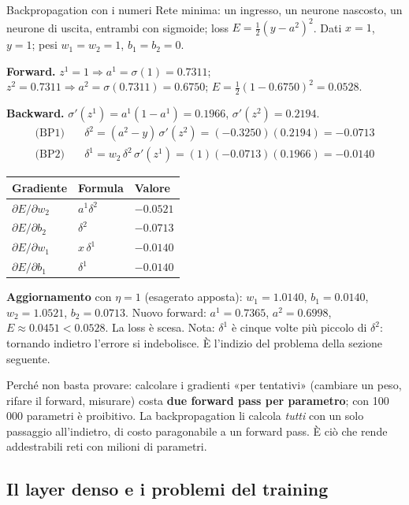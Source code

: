 \documentclass[12pt]{extarticle}
\begin{document}
\begin{esempiobox}{Backpropagation con i numeri}
Rete minima: un ingresso, un neurone nascosto, un neurone di uscita, entrambi con sigmoide; loss $E=\frac12(y-a^2)^2$. Dati $x=1$, $y=1$; pesi $w_1=w_2=1$, $b_1=b_2=0$.

\smallskip\noindent\textbf{Forward.} $z^1=1\Rightarrow a^1=\sigma(1)=0.7311$; $z^2=0.7311\Rightarrow a^2=\sigma(0.7311)=0.6750$; $E=\frac12(1-0.6750)^2=0.0528$.

\smallskip\noindent\textbf{Backward.} $\sigma'(z^1)=a^1(1-a^1)=0.1966$, $\sigma'(z^2)=0.2194$.
\begin{align*}
\text{(BP1)}\quad&\delta^2=(a^2-y)\,\sigma'(z^2)=(-0.3250)(0.2194)=-0.0713\\
\text{(BP2)}\quad&\delta^1=w_2\,\delta^2\,\sigma'(z^1)=(1)(-0.0713)(0.1966)=-0.0140
\end{align*}
\begin{center}
\small
\begin{tabular}{lll}
    \toprule
    \textbf{Gradiente} & \textbf{Formula} & \textbf{Valore} \\
    \midrule
    $\partial E/\partial w_2$ & $a^1\delta^2$ & $-0.0521$ \\
    $\partial E/\partial b_2$ & $\delta^2$ & $-0.0713$ \\
    $\partial E/\partial w_1$ & $x\,\delta^1$ & $-0.0140$ \\
    $\partial E/\partial b_1$ & $\delta^1$ & $-0.0140$ \\
    \bottomrule
\end{tabular}
\end{center}
\textbf{Aggiornamento} con $\eta=1$ (esagerato apposta): $w_1=1.0140$, $b_1=0.0140$, $w_2=1.0521$, $b_2=0.0713$. Nuovo forward: $a^1=0.7365$, $a^2=0.6998$, $E\approx0.0451<0.0528$. La loss è scesa. Nota: $\delta^1$ è cinque volte più piccolo di $\delta^2$: tornando indietro l'errore si indebolisce. È l'indizio del problema della sezione seguente.
\end{esempiobox}

\noindent Perché non basta provare: calcolare i gradienti «per tentativi» (cambiare un peso, rifare il forward, misurare) costa \textbf{due forward pass per parametro}; con 100\,000 parametri è proibitivo. La backpropagation li calcola \emph{tutti} con un solo passaggio all'indietro, di costo paragonabile a un forward pass. È ciò che rende addestrabili reti con milioni di parametri.

\subsection{Il layer denso e i problemi del training}
\end{document}
